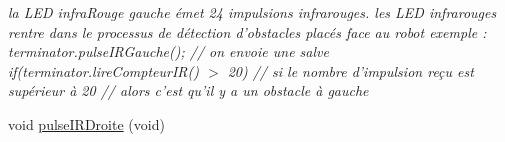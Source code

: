 \begin{DoxyCompactItemize}
\begin{DoxyCompactList}\small\item\em la L\-E\-D infra\-Rouge gauche émet 24 impulsions infrarouges. les L\-E\-D infrarouges rentre dans le processus de détection d'obstacles placés face au robot exemple \-: terminator.\-pulse\-I\-R\-Gauche(); // on envoie une salve if(terminator.\-lire\-Compteur\-I\-R() $>$ 20) // si le nombre d'impulsion reçu est supérieur à 20 // alors c'est qu'il y a un obstacle à gauche \end{DoxyCompactList}\item 
\hypertarget{class_d_f_robot2_w_d_add2e75d46648d2f96fcdc0637799ae57}{void \hyperlink{class_d_f_robot2_w_d_add2e75d46648d2f96fcdc0637799ae57}{pulse\-I\-R\-Droite} (void)}\label{class_d_f_robot2_w_d_add2e75d46648d2f96fcdc0637799ae57}


\end{DoxyCompactItemize}
